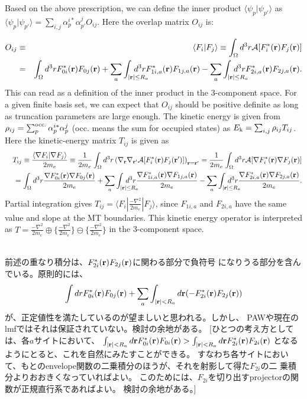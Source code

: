 \documentclass[twocolumn,showpacs,preprintnumbers,amsmath,amssymb,floatfix]{revtex4-1}
\newcommand{\bfr}{{\bf r}}
\def\calR{{\cal A}}
\def\inta{\int_{|\bfr|\leq R_a}\!\!\!\!\!\!\!\!\!\!\!\!}
\def\ek{E_{\rm k}}
\def\inta{\int_{|\bfr|\leq R_a}\!\!\!\!\!\!\!\!\!\!\!\!}
\def\ek{E_{\rm k}}
\begin{document}
Based on the above prescription, we can define the inner product 
$\langle \psi_p |\psi_{p'} \rangle$ as $\langle \psi_p |\psi_{p'}
\rangle=\sum_{i,j}\alpha_{p}^{i*}\alpha_{p'}^{j}O_{ij}$.
Here the overlap matrix  $O_{ij}$ is:
\begin{widetext}
\begin{eqnarray}
O_{ij} &\equiv& \langle F_i|F_{j} \rangle \equiv \int_\Omega d^3r 
  \calR[F^*_i(\bfr)F_j(\bfr)] \nonumber \\
&=&\int_\Omega d^3r  F^*_{0i}(\bfr)F_{0j}(\bfr)
  + \sum_a \inta d^3r  F^*_{1i,a}(\bfr)F_{1j,a}(\bfr) 
  - \sum_a \inta d^3r  F^*_{2i,a}(\bfr)F_{2j,a}(\bfr).  \label{eq:norm} 
\end{eqnarray}
This can read as a definition of the inner product in the 3-component space.
For a given finite basis set, we can expect that $O_{ij}$ should be
positive definite as long as truncation parameters are large enough.
The kinetic energy is given 
from $\rho_{ij}=\sum_{p}^{\rm occ.} \alpha^{i*}_p \alpha^j_p$ (occ. means
the sum for occupied states) as $\ek=\sum_{i,j} \rho_{ij} T_{ij}$.
Here the kinetic-energy matrix $T_{ij}$ is given as
\begin{eqnarray}
&&T_{ij}\equiv \frac{\langle \nabla F_i| \nabla F_{j} \rangle}{2m_e}
 \equiv \frac{1}{2m_e} \int_\Omega d^3r \left(\nabla_\bfr \nabla_{\bfr'}
 \calR[F^*_i(\bfr)F_j(\bfr')]\right)_{\bfr=\bfr'} 
=\frac{1}{2m_e} \int_\Omega d^3r 
\calR[\nabla F^*_i(\bfr) \nabla F_j(\bfr)] \nonumber \\
&&= \int_\Omega d^3r \frac{\nabla F^*_{0i}(\bfr) \nabla F_{0j}(\bfr)}{2m_e} 
+ \sum_a \inta d^3r \frac{\nabla F^*_{1i,a}(\bfr) \nabla F_{1j,a}(\bfr)}{2m_e}
- \sum_a \inta d^3r \frac{\nabla F^*_{2i,a}(\bfr) \nabla F_{2j,a}(\bfr)}{2m_e}.
\label{eq:kin}
\end{eqnarray}
Partial integration gives $T_{ij}= \langle F_i| \frac{-\nabla^2 }{2m_e}|F_{j} \rangle$, 
since $F_{1i,a}$ and $F_{2i,a}$ have the same value and slope at the MT boundaries.
This kinetic energy operator is interpreted as $T=\frac{-\nabla^2 }{2m_e} \oplus
\{\frac{-\nabla^2 }{2m_e} \} \ominus  \{\frac{-\nabla^2 }{2m_e} \}$ in the 3-component space.

{\small 
{}\\
前述の重なり積分は、$F^{*}_{2i}(\bfr) F_{2j}(\bfr)$に関わる部分で負符号
になりうる部分を含んでいる。原則的には、
\begin{eqnarray}
\int dr F^*_{0i}(\bfr) F_{0j}(\bfr)  
+ \sum_a \int_{|\bfr| <R_a} d\bfr ( - F^{*}_{2i}(\bfr) F_{2j}(\bfr)) \nonumber 
\label{eq:over2}
\end{eqnarray}
が、正定値性を満たしているのが望ましいと思われる。しかし、
PAWや現在のlmfではそれは保証されていない。検討の余地がある。
[ひとつの考え方としては、各$a$サイトにおいて、
$\int_{|\bfr| <R_a} d\bfr F^*_{0i}(\bfr) F_{0i}(\bfr)  
>\int_{|\bfr| <R_a} d\bfr F^{*}_{2i}(\bfr) F_{2i}(\bfr)$ 
となるようにとると、これを自然にみたすことができる。
すなわち各サイトにおいて、もとのenvelope関数の二乗積分のほうが、それを射影して得た$F_{2i}$の二
乗積分よりおおきくなっていればよい。
このためには、$F_{2i}$を切り出すprojectorの関数が正規直行系であればよい。
検討の余地がある。]
}


\end{widetext}
\end{document}

